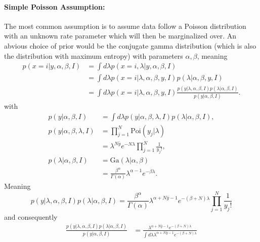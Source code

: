 \begin{example}
	\paragraph{Simple Poisson Assumption:} The most common assumption is to assume data follow a Poisson distribution with an unknown rate parameter which will then be marginalized over. An abvious choice of prior would be the conjugate gamma distribution (which is also the distribution with maximum entropy) with parameters $\alpha, \beta$, meaning
	\begin{equation}
		\begin{split}
			p(x =i|y,\alpha, \beta,I) &= \int d\lambda p(x =i,\lambda|y,\alpha, \beta,I)\\
			&=\int d\lambda p(x =i|\lambda,\alpha, \beta,y,I)p(\lambda|\alpha, \beta,y,I)\\
			&= \int d\lambda p(x =i|\lambda,\alpha, \beta,y,I)\frac{p(y|\lambda,\alpha, \beta,I)p(\lambda|\alpha, \beta,I)}{p(y|\alpha, \beta,I)}.
		\end{split}
		\label{h4}
	\end{equation}
	with
	\begin{equation}
		\begin{split}
			p(y|\alpha, \beta,I) & = \int d \lambda p(y|\alpha, \beta,\lambda,I)p(\lambda|\alpha, \beta,I),\\
			p(y|\alpha, \beta,\lambda,I) &= \prod_{j=1}^N\text{Poi}(y_j|\lambda)\\
			&= \lambda^{N\bar{y}}e^{-N\lambda}\prod_{j=1}^N \frac{1}{y_j!},\\
			p(\lambda|\alpha,\beta,I) &= \text{Ga}(\lambda|\alpha,\beta)\\ &=\frac{\beta ^\alpha}{\Gamma(\alpha)}\lambda^{\alpha-1}e^{-\beta \lambda}.
		\end{split}
	\end{equation}
	Meaning
	\begin{equation}
		p(y|\lambda,\alpha, \beta,I)p(\lambda|\alpha, \beta,I) = \frac{\beta^\alpha}{\Gamma(\alpha)}\lambda^{\alpha+N\bar{y}-1}e^{-(\beta+N)\lambda}\prod_{j=1}^N \frac{1}{y_j!}
	\end{equation}
	and consequently
	\begin{equation}
		\begin{split}
			\frac{p(y|\lambda,\alpha, \beta,I)p(\lambda|\alpha, \beta,I)}{p(y|\alpha, \beta,I)} &= \frac{\lambda^{\alpha+N\bar{y}-1}e^{-(\beta+N)\lambda}}{\int d\lambda \lambda^{\alpha+N\bar{y}-1}e^{-(\beta+N)\lambda}}\\

\end{split}
\end{equation}
\end{example}
